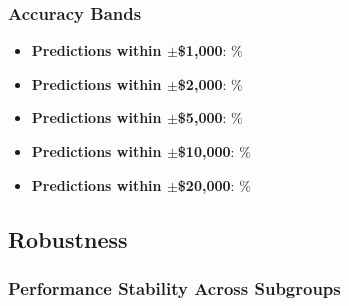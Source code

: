 \subsubsection{Accuracy Bands}

\begin{itemize}
    \item \textbf{Predictions within $\pm$\$1,000}: \ModelThreeWithinOneK{}\%
    \item \textbf{Predictions within $\pm$\$2,000}: \ModelThreeWithinTwoK{}\%
    \item \textbf{Predictions within $\pm$\$5,000}: \ModelThreeWithinFiveK{}\%
    \item \textbf{Predictions within $\pm$\$10,000}: \ModelThreeWithinTenK{}\%
    \item \textbf{Predictions within $\pm$\$20,000}: \ModelThreeWithinTwentyK{}\%
\end{itemize}

\subsection{Robustness}

\subsubsection{Performance Stability Across Subgroups}

